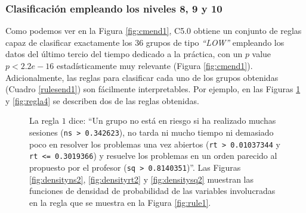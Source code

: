 \subsubsection{Clasificación empleando los niveles 8, 9 y 10}

Como podemos ver en la Figura \ref{fig:cmend1}, C5.0 obtiene un conjunto de reglas capaz de clasificar exactamente los $36$ grupos de tipo \emph{``LOW''} empleando los datos del último tercio del tiempo dedicado a la práctica, con un $p$ value $p < 2.2e-16$ estadísticamente muy relevante (Figura \ref{fig:cmend1}). Adicionalmente, las reglas para clasificar cada uno de los grupos obtenidas (Cuadro \ref{rulesend1}) son fácilmente interpretables. Por ejemplo, en las Figuras \ref{fig:regla1} y \ref{fig:regla4} se describen dos de las reglas obtenidas.

\begin{figure}[H]
\centering
{}\qquad
{}\qquad
{}\qquad
{}\qquad
\caption{La regla $1$ dice: ``Un grupo no está en riesgo si ha realizado muchas sesiones (\texttt{ns > 0.342623}), no tarda ni mucho tiempo ni demasiado poco en resolver los problemas una vez abiertos (\texttt{rt > 0.01037344} y \texttt{rt <= 0.3019366}) y resuelve los problemas en un orden parecido al propuesto por el profesor (\texttt{sq > 0.8140351})''. Las Figuras \ref{fig:densityns2}, \ref{fig:densityrt2} y \ref{fig:densitysq2} muestran las funciones de densidad de probabilidad de las variables involucradas en la regla que se muestra en la Figura \ref{fig:rule1}.}
\label{fig:regla1}
\end{figure}

